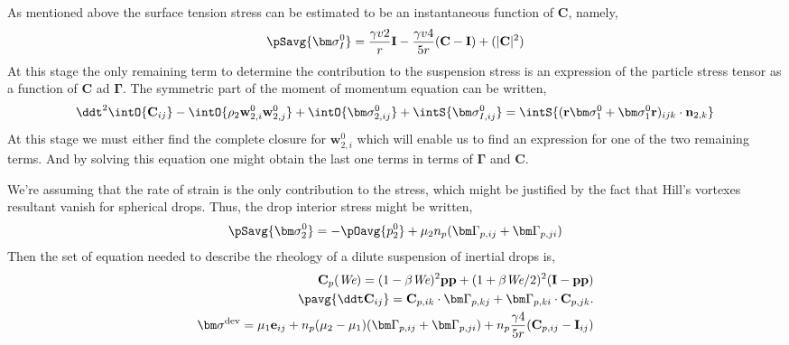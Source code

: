 As mentioned above the surface tension stress can be estimated to be an instantaneous function of \textbf{C}, namely, 
\begin{align*}
    \pSavg{\bm\sigma_I^0}
    = \frac{\gamma v 2}{r} \textbf{I} - \frac{\gamma v 4}{5 r} (\textbf{C} - \textbf{I})
    +\mathcal(|\textbf{C}|^2)
\end{align*}
At this stage the only remaining term to determine the contribution to the suspension stress is an expression of the particle stress tensor as a function of \textbf{C} ad $\bm\Gamma$. 
The symmetric part of the moment of momentum equation can be written,
\begin{equation*}
    \ddt^2\intO{\textbf{C}_{ij}}
    -\intO{\rho_2\textbf{w}_{2,i}^0\textbf{w}_{2,j}^0}
    + \intO{\bm\sigma_{2,ij}^0}
    + \intS{\bm\sigma_{I,ij}^0}
    = \intS{(\textbf{r}\bm\sigma_1^0+ \bm\sigma_1^0 \textbf{r})_{ijk}\cdot \textbf{n}_{2,k}}
\end{equation*}
At this stage we must either find the complete closure for $\textbf{w}_{2,i}^0$ which will enable us to find an expression for one of the two remaining terms.
And by solving this equation one might obtain the last one terms in terms of $\bm\Gamma$ and \textbf{C}. 

We're assuming that the rate of strain is the only contribution to the stress, which might be justified by the fact that Hill's vortexes resultant vanish for spherical drops. 
Thus, the drop interior stress might be written, 
\begin{equation*}
    \pSavg{\bm\sigma_2^0}
    =-\pOavg{p_2^0} 
    + \mu_2 n_p (\bm\Gamma_{p,ij}+\bm\Gamma_{p,ji})
\end{equation*}
Then the set of equation needed to describe the rheology of a dilute suspension of inertial drops is, 
\begin{align*}
    \textbf{C}_p(\textit{We})
    = (1 - \beta \textit{We} )^2 \textbf{pp}
    + 
     (1 + \beta \textit{We}/2  )^2 (\textbf{I}-\textbf{pp})\\
    \pavg{\ddt \textbf{C}_{ij}}
    = \textbf{C}_{p,ik} \cdot \bm\Gamma_{p,kj}
    +  \bm\Gamma_{p,ki} \cdot \textbf{C}_{p,jk}.\\
    \bm\sigma^\text{dev}
    = 
    \mu_1 \textbf{e}_{ij}
    +  n_p (\mu_2 - \mu_1) (\bm\Gamma_{p,ij} + \bm\Gamma_{p,ji})
    + n_p \frac{\gamma  4}{5 r} (\textbf{C}_{p,ij} - \textbf{I}_{ij})
\end{align*}

